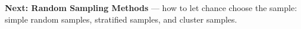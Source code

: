 \documentclass[12pt]{article}
\begin{document}
\vspace{0.04in}

\boxguard[3]
\begin{spiralbox}
\small
\textbf{Next: Random Sampling Methods} --- how to let chance choose the sample: simple random
samples, stratified samples, and cluster samples.
\end{spiralbox}
\end{document}
